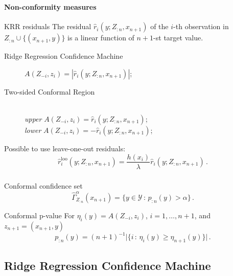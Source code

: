 \documentclass[t]{beamer}  %
\newcommand{\Ycal}{\mathcal{Y}}
\begin{document}
\begin{frame}[t]\frametitle{\insertsection}
  \framesubtitle{Non-conformity measures}
  \begin{block}{KRR residuals}  
    The residual $\hat{r}_i(y; Z_{:n}, x_{n+1})$ of the $i$-th observation in
    $Z_{:n}\cup\{(x_{n+1}, y)\}$ is a linear function of $n+1$-st target value.
  \end{block}

  \begin{description}
    \item[Ridge Regression Confidence Machine] $A(Z_{-i}, z_i) = |\hat{r}_i(y; Z_{:n}, x_{n+1})|$;
    \vspace{\baselineskip}
    \item[Two-sided Conformal Region] \hfill\\
      \textit{upper} $A(Z_{-i}, z_i) = \hat{r}_i(y; Z_{:n}, x_{n+1})$;\hfill\\
      \textit{lower} $A(Z_{-i}, z_i) = -\hat{r}_i(y; Z_{:n}, x_{n+1})$;
  \end{description}

  Possible to use leave-one-out residuals:
  $$ \hat{r}^{\text{loo}}_i(y; Z_{:n}, x_{n+1})
    = \frac{h(x_i)}{\lambda} \hat{r}_i(y; Z_{:n}, x_{n+1}) \,. $$
\end{frame}

\begin{frame}[c]\frametitle{\insertsection}
  \begin{block}{Conformal confidence set}
    $$ \hat{\Gamma}_{Z_{:n}}^\alpha(x_{n+1})
        = \bigl\{ y \in \Ycal \,:\, p_{:n}(y) > \alpha \bigr\}
      \,. $$
  \end{block}

  \begin{block}{Conformal p-value}
    For $\eta_i(y) = A(Z_{-i}, z_i)$, $i=1,\ldots,n+1$, and $z_{n+1} = (x_{n+1}, y)$
    $$ p_{:n}(y) = (n+1)^{-1} \bigl\lvert\{ i \,:\, \eta_i(y) \geq \eta_{n+1}(y) \}\bigr\rvert
      \,. $$
  \end{block}
\end{frame}

\subsection{Ridge Regression Confidence Machine} %
\label{sub:ridge_regression_confidence_machine}
\end{document}
